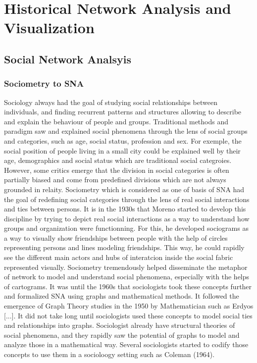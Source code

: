 
\chapter{Historical Network Analysis and Visualization}



\section{Social Network Analsyis}


\subsection{Sociometry to SNA}

Sociology always had the goal of studying social relationships between individuals, and finding recurrent patterns and structures allowing to describe and explain the behaviour of people and groups. Traditional methods and paradigm saw and explained social phenomena through the lens of social groups and categories, such as age, social status, profession and sex. For exemple, the social position of people living in a small city could be explained well by their age, demographics and social status which are traditional social categroies.
However, some critics emerge that the division in social categories is often partially biased and come from predefined divisions which are not always grounded in relaity.
Sociometry which is considered as one of basis of SNA had the goal of redefining social categories through the lens of real social interactions and ties between persons.
It is in the 1930s that Moreno started to develop this discipline by trying to depict real social interactions as a way to understand how groups and organization were functionning. For this, he developed sociograms as a way to visually show friendships between people with the help of circles representing persons and lines modeling friendships. This way, he could rapidly see the different main actors and hubs of interatcion inside the social fabric represented visually. Sociometry tremendously helped disseminate the metaphor of network to model and understand social phenomena, especially with the helps of cartograms.
It was until the 1960s that sociologists took these concepts further and formalized SNA using graphs and mathematical methods. It followed the emergence of Graph Theory studies in the 1950 by Mathematician such as Erdyos [...].
It did not take long until sociologists used these concepts to model social ties and relationships into graphs. Sociologist already have structural theories of social phenomena, and they rapidly saw the potential of graphs to model and analyze those in a mathematical way. Several sociologists started to codify those concepts to use them in a socioloogy setting such as Coleman (1964).
